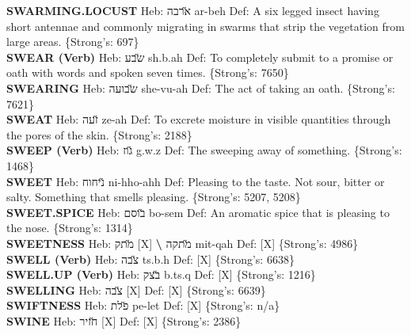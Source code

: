{\textbf{SWARMING.LOCUST} Heb: {\large\H ארבה} ar-beh Def: A six legged insect having short antennae and commonly migrating in swarms that strip the vegetation from large areas. \{Strong's: 697\}\hfill{}\\

\textbf{SWEAR (Verb)} Heb: {\large\H שבע} sh.b.ah Def: To completely submit to a promise or oath with words and spoken seven times. \{Strong's: 7650\}\hfill{}\\

\textbf{SWEARING} Heb: {\large\H שבועה} she-vu-ah Def: The act of taking an oath. \{Strong's: 7621\}\hfill{}\\

\textbf{SWEAT} Heb: {\large\H זעה} ze-ah Def: To excrete moisture in visible quantities through the pores of the skin. \{Strong's: 2188\}\hfill{}\\

\textbf{SWEEP (Verb)} Heb: {\large\H גוז} g.w.z Def: The sweeping away of something. \{Strong's: 1468\}\hfill{}\\

\textbf{SWEET} Heb: {\large\H ניחוח} ni-hho-ahh Def: Pleasing to the taste. Not sour, bitter or salty. Something that smells pleasing. \{Strong's: 5207, 5208\}\hfill{}\\

\textbf{SWEET.SPICE} Heb: {\large\H בוסם} bo-sem Def: An aromatic spice that is pleasing to the nose. \{Strong's: 1314\}\hfill{}\\

\textbf{SWEETNESS} Heb: {\large\H מתק} {[}X{]} \textbf{\textbackslash{}} {\large\H מתקה} mit-qah Def: {[}X{]} \{Strong's: 4986\}\hfill{}\\

\textbf{SWELL (Verb)} Heb: {\large\H צבה} ts.b.h Def: {[}X{]} \{Strong's: 6638\}\hfill{}\\

\textbf{SWELL.UP (Verb)} Heb: {\large\H בצק} b.ts.q Def: {[}X{]} \{Strong's: 1216\}\hfill{}\\

\textbf{SWELLING} Heb: {\large\H צבה} {[}X{]} Def: {[}X{]} \{Strong's: 6639\}\hfill{}\\

\textbf{SWIFTNESS} Heb: {\large\H פלת} pe-let Def: {[}X{]} \{Strong's: n/a\}\hfill{}\\

\textbf{SWINE} Heb: {\large\H חזיר} {[}X{]} Def: {[}X{]} \{Strong's: 2386\}\hfill{}\\

}
